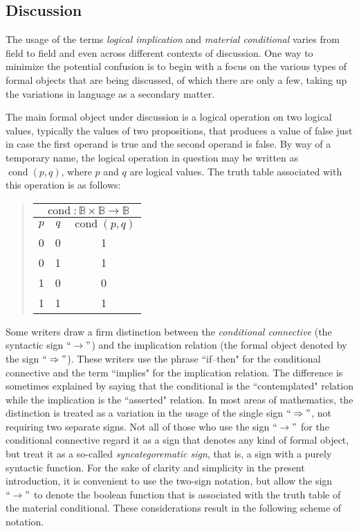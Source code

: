 \documentclass[12pt]{article}
\begin{document}
\subsection{Discussion}

The usage of the terms \textit{logical implication} and \textit{material conditional} varies from field to field and even across different contexts of discussion.  One way to minimize the potential confusion is to begin with a focus on the various types of formal objects that are being discussed, of which there are only a few, taking up the variations in language as a secondary matter.

The main formal object under discussion is a logical operation on two logical values, typically the values of two propositions, that produces a value of false just in case the first operand is true and the second operand is false.  By way of a temporary name, the logical operation in question may be written as $\operatorname{cond}(p, q)$, where $p$ and $q$ are logical values.  The truth table associated with this operation is as follows:

\begin{quote}\begin{tabular}{|c|c|c|}
\multicolumn{3}{c}{$\operatorname{cond} : \mathbb{B} \times \mathbb{B} \to \mathbb{B}$} \\
\hline
$p$ & $q$ & $\operatorname{cond}(p, q)$ \\
\hline\hline
 0  &  0  &  1 \\
 0  &  1  &  1 \\
 1  &  0  &  0 \\
 1  &  1  &  1 \\
\hline
\end{tabular}\end{quote}

Some writers draw a firm distinction between the \textit{conditional connective} (the syntactic sign $``\rightarrow"$) and the implication relation (the formal object denoted by the sign $``\Rightarrow"$).  These writers use the phrase ``if--then" for the conditional connective and the term ``implies" for the implication relation.  The difference is sometimes explained by saying that the conditional is the ``contemplated" relation while the implication is the ``asserted" relation.  In most areas of mathematics, the distinction is treated as a variation in the usage of the single sign $``\Rightarrow"$, not requiring two separate signs.  Not all of those who use the sign $``\rightarrow"$ for the conditional connective regard it as a sign that denotes any kind of formal object, but treat it as a so-called \textit{syncategorematic sign}, that is, a sign with a purely syntactic function.  For the sake of clarity and simplicity in the present introduction, it is convenient to use the two-sign notation, but allow the sign $``\rightarrow"$ to denote the boolean function that is associated with the truth table of the material conditional.  These considerations result in the following scheme of notation.
\end{document}
